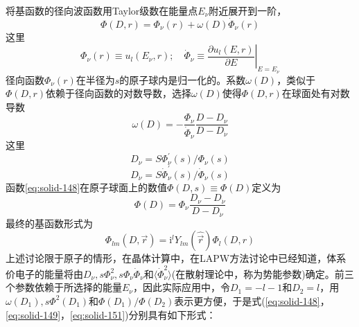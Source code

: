 将基函数的径向波函数用Taylor级数在能量点$E_{\nu}$附近展开到一阶，
\begin{equation}
  \Phi(D,r)=\Phi_{\nu}(r)+\omega(D)\dot\Phi_{\nu}(r)
  \label{eq:solid-148}
\end{equation}
这里
$$\Phi_{\nu}(r)\equiv u_l(E_{\nu},r);\quad\dot\Phi_{\nu}\equiv\left.\frac{\partial u_l(E,r)}{\partial E}\right|_{E=E_{\nu}}$$
径向函数$\Phi_{\nu}(r)$在半径为$s$的原子球内是归一化的。系数$\omega(D)$，类似于$\Phi(D,r)$依赖于径向函数的对数导数，选择$\omega(D)$使得$\Phi(D,r)$在球面处有对数导数
\begin{equation}
  \omega(D)=-\frac{\Phi_{\nu}}{\dot\Phi_{\nu}}\frac{D-D_{\nu}}{D-D_{\dot\nu}}
  \label{eq:solid-149}
\end{equation}
这里
\begin{equation}
  D_{\nu}=S\Phi_{\nu}^{\prime}(s)/\Phi_{\nu}(s)
  \label{equation-150}
\end{equation}
\begin{equation}
  D_{\dot\nu}=S\dot\Phi_{\nu}^{\prime}(s)/\dot\Phi_{\nu}(s)
  \label{eq:solid-151}
\end{equation}
函数\eqref{eq:solid-148}在原子球面上的数值$\Phi(D,s)\equiv\Phi(D)$定义为
\begin{equation}
  \Phi(D)=\Phi_{\nu}\frac{D_{\nu}-D_{\dot\nu}}{D-D_{\dot\nu}}
  \label{eq:solid-152}
\end{equation}
最终的基函数形式为
\begin{equation}
	\Phi_{lm}(D,\vec r)=\mathrm{i}^lY_{lm}(\hat{\vec r})\Phi_l(D,r)
  \label{eq:solid-153}
\end{equation}
上述讨论限于原子的情形，在晶体计算中，在LAPW方法讨论中已经知道，体系价电子的能量将由$D_{\nu},s\Phi_{\nu}^2,s\Phi_{\nu}\dot\Phi_{\nu}$和$\langle\dot\Phi_{\nu}^2\rangle$(在散射理论中，称为势能参数)确定。前三个参数依赖于所选择的能量$E_{\nu}$，因此实际应用中，令$D_1=-l-1$和$D_2=l$，用$\omega(D_1),s\Phi^2(D_1)$和$\Phi(D_1)/\Phi(D_2)$表示更方便，于是式(\ref{eq:solid-148}，\ref{eq:solid-149}，\ref{eq:solid-151})分别具有如下形式：%

